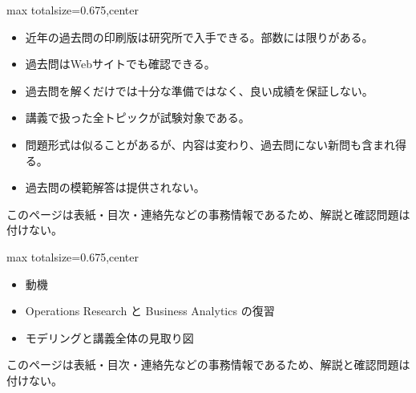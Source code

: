 \clearpage
{}
\begin{adjustbox}{max totalsize={\textwidth}{0.675\textheight},center}
\begin{minipage}{\textwidth}\scriptsize
\begin{minipage}[t]{0.485\textwidth}
\begin{itemize}
\item 近年の過去問の印刷版は研究所で入手できる。部数には限りがある。
\item 過去問はWebサイトでも確認できる。
\item 過去問を解くだけでは十分な準備ではなく、良い成績を保証しない。
\item 講義で扱った全トピックが試験対象である。
\item 問題形式は似ることがあるが、内容は変わり、過去問にない新問も含まれ得る。
\item 過去問の模範解答は提供されない。
\end{itemize}
\end{minipage}\hfill
\begin{minipage}[t]{0.485\textwidth}
{\small このページは表紙・目次・連絡先などの事務情報であるため、解説と確認問題は付けない。}
\end{minipage}
\end{minipage}
\end{adjustbox}

\clearpage
{}
\begin{adjustbox}{max totalsize={\textwidth}{0.675\textheight},center}
\begin{minipage}{\textwidth}\scriptsize
\begin{minipage}[t]{0.485\textwidth}
\begin{itemize}
\item 動機
\item Operations Research と Business Analytics の復習
\item モデリングと講義全体の見取り図
\end{itemize}
\end{minipage}\hfill
\begin{minipage}[t]{0.485\textwidth}
{\small このページは表紙・目次・連絡先などの事務情報であるため、解説と確認問題は付けない。}
\end{minipage}
\end{minipage}
\end{adjustbox}


